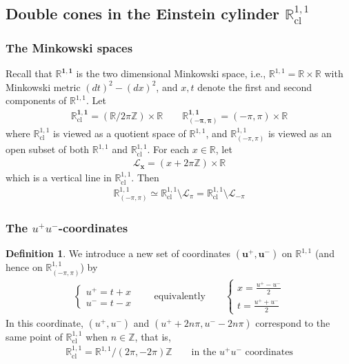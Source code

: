 \documentclass[11pt,b5paper,notitlepage]{article}
\theoremstyle{definition}
\newtheorem{df}{Definition}[section]
\theoremstyle{plain}
\newcommand{\Zbb}{\mathbb Z}
\newcommand{\Rbb}{\mathbb R}
\newcommand{\Roo}{\mathbb R^{1,1}}
\newcommand{\Rcl}{\mathbb R^{1,1}_{\mathrm{cl}}}
\newcommand{\Rpp}{\mathbb R^{1,1}_{(-\pi,\pi)}}
\newcommand{\SL}{\mathscr L}
\numberwithin{equation}{section}
\begin{document}
\subsection{Double cones in the Einstein cylinder $\Rcl$}

\subsubsection{The Minkowski spaces}\label{lb65}

Recall that $\pmb{\Rbb^{1,1}}$ is the two dimensional Minkowski space, i.e., $\Rbb^{1,1}=\Rbb\times\Rbb$ with Minkowski metric $(dt)^2-(dx)^2$, and $x,t$ denote the first and second components of $\Rbb^{1,1}$. Let
\begin{align*}
\pmb{\Rcl}=(\Rbb/2\pi\Zbb)\times\Rbb\qquad \pmb{\Rpp}=(-\pi,\pi)\times\Rbb
\end{align*}
where $\Rcl$ is viewed as a quotient space of $\Roo$, and $\Rpp$ is viewed as an open subset of both $\Roo$ and $\Rcl$. For each $x\in\Rbb$, let
\begin{align}\label{eq29}
\pmb{\SL_x}=(x+2\pi\Zbb)\times\Rbb
\end{align}
which is a vertical line in $\Rcl$. Then
\begin{align*}
\Rpp\simeq \Rcl\setminus\SL_\pi=\Rcl\setminus\SL_{-\pi}
\end{align*}

\subsubsection{The $u^+u^-$-coordinates}


\begin{df}
We introduce a new set of coordinates $\pmb{(u^+,u^-)}$ on $\Roo$ (and hence on $\Rpp$) by
\begin{align*}
\left\{
\begin{array}{l}
u^+=t+x\\[0.5ex]
u^-=t-x
\end{array}
\right.\qquad\text{equivalently}\qquad
\left\{
\begin{array}{l}
x=\frac{u^+-u^-}2\\[0.5ex]
t=\frac{u^++u^-}2
\end{array}
\right.
\end{align*}
In this coordinate, $(u^+,u^-)$ and $(u^++2n\pi,u^--2n\pi)$ correspond to the same point of $\Rcl$ when $n\in\Zbb$, that is,
\begin{align}\label{eq25}
\Rcl=\Roo/(2\pi,-2\pi)\Zbb\qquad\text{in the }u^+u^-\text{ coordinates}
\end{align}
\end{df}
\end{document}
